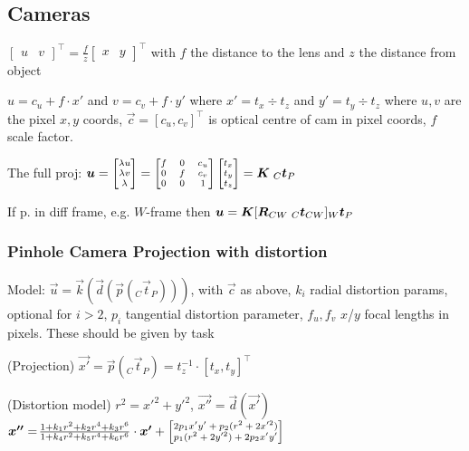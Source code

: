 \subsection{Cameras}
$\begin{bmatrix}
        u & v
    \end{bmatrix}^\top
    = \frac{f}{z}
    \begin{bmatrix}
        x & y
    \end{bmatrix}^\top$
with $f$ the distance to the lens and $z$ the distance from object

$u = c_u + f \cdot x'$ and $v = c_v + f \cdot y'$ where $x' = t_x \div t_z$ and $y' = t_y \div t_z$
where $u, v$ are the pixel $x, y$ coords, $\vec{c} = [c_u, c_v]^\top$ is optical centre of cam in pixel coords, $f$ scale factor.

The full proj:
$\vec{u} =
    {\scriptsize
    \begin{bmatrix}
        \lambda u \\
        \lambda v \\
        \lambda
    \end{bmatrix}
    =
    \begin{bmatrix}
        f & 0 & c_u \\
        0 & f & c_v \\
        0 & 0 & 1
    \end{bmatrix}
    \begin{bmatrix}
        t_x \\t_y\\t_z
    \end{bmatrix}
    }
    = \mat{K}\; {_C}\vec{t}_P$

If p. in diff frame, e.g. $W$-frame then $\vec{u} = \mat{K}[\mat{R}_{CW}\; {_C}\vec{t}_{CW}] {_W}\vec{t}_P$

\subsubsection{Pinhole Camera Projection with distortion}
\shortdefinition Model: $\vec{u} = \vec{k}(\vec{d}(\vec{p}({_C}\vec{t}_P)))$, with $\vec{c}$ as above, $k_i$ radial distortion params, optional for $i > 2$,
$p_i$ tangential distortion parameter, $f_u, f_v$ $x$/$y$ focal lengths in pixels. These should be given by task

(Projection) $\vec{x'} = \vec{p}({_C}\vec{t}_P) = t_z^{-1} \cdot [t_x, t_y]^\top$

(Distortion model) $r^2 = x'^2 + y'^2$, $\vec{x''} = \vec{d}(\vec{x'})$\\
$\vec{x''} = \! \frac{1 + k_1 r^2 + k_2 r^4 + k_3 r^6}{1 + k_4 r^2 + k_5 r^4 + k_6 r^6} \cdot \vec{x'}
    +
    {\scriptsize
    \begin{bmatrix}
        2p_1 x' y' + p_2(r^2 + 2x'^2) \\
        p_1 (r^2 + 2y'^2) + 2p_2 x'y'
    \end{bmatrix}
    }$

